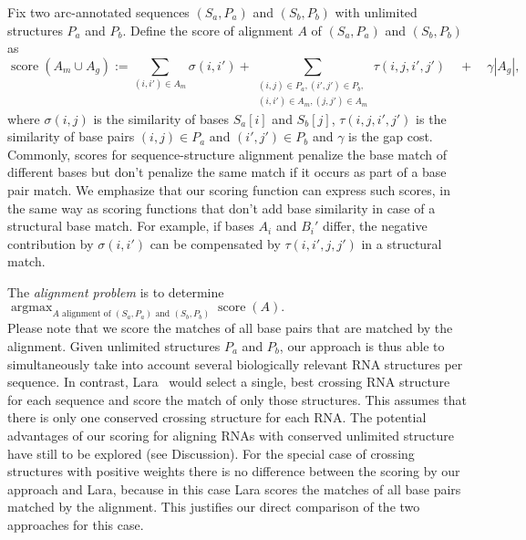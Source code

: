 \documentclass{easychair}
\newcommand{\score}{\operatorname{score}}
\newcommand{\argmax}{\operatorname*{arg max}}
\begin{document}
Fix two arc-annotated sequences $(S_a,P_a)$ and $(S_b,P_b)$ with
unlimited structures $P_a$ and $P_b$. Define the score of alignment $A$
of $(S_a,P_a)$ and $(S_b,P_b)$ as
\begin{displaymath}
  \score(A_m\cup A_g) :=
  \sum_{(i,i')\in A_m} \sigma(i,i')
  + \sum_{\substack{(i,j)\in P_a,(i',j')\in P_b,\\(i,i')\in A_m,(j,j')\in A_m}} \tau(i,j,i',j')
  \quad + \quad\gamma |A_g|,
\end{displaymath}
where $\sigma(i,j)$ is the similarity of bases $S_a[i]$ and $S_b[j]$,
$\tau(i,j,i',j')$ is the similarity of base pairs $(i,j)\in P_a$
and $(i',j')\in P_b$ and $\gamma$ is the gap cost.
Commonly, scores for sequence-structure alignment penalize the base
match of different bases but don't penalize the same match if it
occurs as part of a base pair match. We emphasize that our scoring
function can express such scores, in the same way as scoring functions
that don't add base similarity in case of a structural base match.
For example, if bases $A_i$ and $B_i'$ differ, the negative
contribution by $\sigma(i,i')$ can be compensated by $\tau(i,i',j,j')$
in a structural match.


The \emph{alignment problem} is to determine
\begin{math}
  \displaystyle\argmax_{\text{$A$ alignment of $(S_a,P_a)$ and $(S_b,P_b)$}} \score(A).
\end{math}\\[3pt]
%
Please note that we score the matches of all base pairs that are
matched by the alignment. Given unlimited structures $P_a$ and $P_b$,
our approach is thus able to simultaneously take into account several
biologically relevant RNA structures per sequence. In contrast,
Lara~\cite{Bauer:Klau:Reinert:Accur_multi_seque:2007} would select a
single, best crossing RNA structure for each sequence and score the
match of only those structures. This assumes that there is only one
conserved crossing structure for each RNA. The potential advantages of
our scoring for aligning RNAs with conserved unlimited structure have
still to be explored (see Discussion). For the special case of
crossing structures with positive weights there is no difference
between the scoring by our approach and Lara, because in this case
Lara scores the matches of all base pairs matched by the
alignment. This justifies our direct comparison of the two approaches
for this case.
\end{document}
